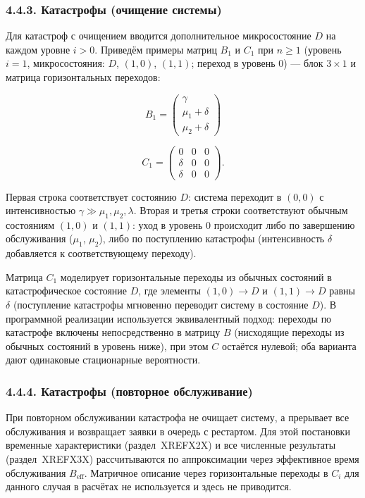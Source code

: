 \subsubsection*{4.4.3. Катастрофы (очищение системы)}
Для катастроф с очищением вводится дополнительное микросостояние \(D\) на каждом уровне \(i>0\). Приведём примеры матриц \(B_1\) и \(C_1\) при \(n\ge 1\) (уровень \(i=1\), микросостояния: \(D\), \((1,0)\), \((1,1)\); переход в уровень 0) --- блок \(3\times 1\) и матрица горизонтальных переходов:




\[B_1=\begin{pmatrix}
\gamma \\ \mu_1+\delta \\ \mu_2+\delta
\end{pmatrix}\]





\[C_1=\begin{pmatrix}
0 & 0 & 0\\
\delta & 0 & 0\\
\delta & 0 & 0
\end{pmatrix}.\]




Первая строка соответствует состоянию \(D\): система переходит в \((0,0)\) с интенсивностью \(\gamma\gg\mu_1,\mu_2,\lambda\). Вторая и третья строки соответствуют обычным состояниям \((1,0)\) и \((1,1)\): уход в уровень 0 происходит либо по завершению обслуживания (\(\mu_1\), \(\mu_2\)), либо по поступлению катастрофы (интенсивность \(\delta\) добавляется к соответствующему переходу).

Матрица \(C_1\) моделирует горизонтальные переходы из обычных состояний в катастрофическое состояние \(D\),
где элементы \((1,0)\to D\) и \((1,1)\to D\) равны \(\delta\) (поступление катастрофы мгновенно переводит систему в состояние \(D\)). В программной реализации используется эквивалентный подход: переходы по катастрофе включены непосредственно в матрицу \(B\) (нисходящие переходы из обычных состояний в уровень ниже), при этом \(C\) остаётся нулевой; оба варианта дают одинаковые стационарные вероятности.

\subsubsection*{4.4.4. Катастрофы (повторное обслуживание)}
При повторном обслуживании катастрофа не очищает систему, а прерывает все обслуживания и возвращает заявки в очередь с рестартом. Для этой постановки временные характеристики (раздел~XREFX2X) и все численные результаты (раздел~XREFX3X) рассчитываются по аппроксимации через эффективное время обслуживания \(B_{\mathrm{eff}}\). Матричное описание через горизонтальные переходы в \(C_i\) для данного случая в расчётах не используется и здесь не приводится.

